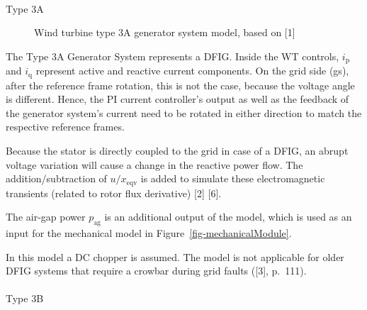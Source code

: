 \documentclass[
  a4paper,
  DIV=11,
  numbers=noendperiod]{scrartcl}
\makeatletter
\let\oldparagraph\paragraph
\renewcommand{\paragraph}{
    \@ifstar
      \xxxParagraphStar
      \xxxParagraphNoStar
  }
\newcommand{\xxxParagraphStar}[1]{\oldparagraph*{#1}\mbox{}}
\newcommand{\xxxParagraphNoStar}[1]{\oldparagraph{#1}\mbox{}}
\makeatother
\begin{document}
\paragraph{Type 3A}\label{type-3a}

\begin{figure}


\caption{\label{fig-generatorType3a}Wind turbine type 3A generator
system model, based on {[}1{]}}

\end{figure}%

The Type 3A Generator System represents a DFIG. Inside the WT controls,
\(i_\mathrm{p}\) and \(i_\mathrm{q}\) represent active and reactive
current components. On the grid side (gs), after the reference frame
rotation, this is not the case, because the voltage angle is different.
Hence, the PI current controller's output as well as the feedback of the
generator system's current need to be rotated in either direction to
match the respective reference frames.

Because the stator is directly coupled to the grid in case of a DFIG, an
abrupt voltage variation will cause a change in the reactive power flow.
The addition/subtraction of \(u / x_\mathrm{eqv}\) is added to simulate
these electromagnetic transients (related to rotor flux derivative)
{[}2{]} {[}6{]}.

The air-gap power \(p_\mathrm{ag}\) is an additional output of the
model, which is used as an input for the mechanical model in
Figure~\ref{fig-mechanicalModule}.

In this model a DC chopper is assumed. The model is not applicable for
older DFIG systems that require a crowbar during grid faults ({[}3{]},
p.~111).

\paragraph{Type 3B}\label{type-3b}
\end{document}
